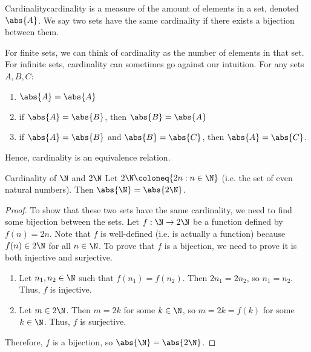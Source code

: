 \begin{dfnbox}{Cardinality}{cardinality}
     is a measure of the amount of elements in a set, denoted $\abs{A}$. We say two sets have the same cardinality if there exists a bijection between them.
\end{dfnbox}

For finite sets, we can think of cardinality as the number of elements in that set. For infinite sets, cardinality can sometimes go against our intuition.     For any sets $A,B,C$:
\begin{enumerate}[noitemsep]
    \item $\abs{A} = \abs{A}$
    \item if $\abs{A} = \abs{B}$, then $\abs{B} = \abs{A}$
    \item if $\abs{A} = \abs{B}$ and $\abs{B} = \abs{C}$, then $\abs{A} = \abs{C}$.
\end{enumerate}
Hence, cardinality is an equivalence relation.


\begin{exbox}{Cardinality of $\N$ and $2\N$}{}
    Let $2\N \coloneq \{ 2n : n \in \N \}$ (i.e. the set of even natural numbers). Then $\abs{\N} = \abs{2\N}$.
    \tcblower
    \begin{proof}
        To show that these two sets have the same cardinality, we need to find some bijection between the sets. Let $f : \N \to 2\N$ be a function defined by $f(n) = 2n$. Note that $f$ is well-defined (i.e. is actually a function) because $f(n) \in 2 \N$ for all $n \in \N$. To prove that $f$ is a bijection, we need to prove it is both injective and surjective.
        \begin{enumerate}
            \item Let $n_1, n_2 \in \N$ such that $f(n_1) = f(n_2)$. Then $2n_1 = 2n_2$, so $n_1 = n_2$. Thus, $f$ is injective.
            \item Let $m \in 2\N$. Then $m = 2k$ for some $k \in \N$, so $m = 2k = f(k)$ for some $k \in \N$. Thus, $f$ is surjective.
        \end{enumerate}
        Therefore, $f$ is a bijection, so $\abs{\N} = \abs{2\N}$.
    \end{proof}
\end{exbox}

